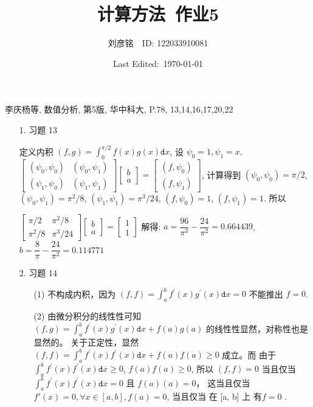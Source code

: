 \documentclass{article}
\title{计算方法\ 作业5}
\author{刘彦铭\ \ ID: 122033910081}
\date{Last Edited:\ \today}
\newcommand{\dd}{\mathtt{d}}
\begin{document}
\maketitle

李庆杨等, 数值分析, 第5版, 华中科大, P.78,
13,14,16,17,20,22

\begin{spacing}{1.5}

\begin{itemize}
    \item [1.] 习题 13
    
    定义内积 $(f, g) = \int_0^{\pi/2} f(x)g(x) \dd x$, 设 $\psi_0=1, \psi_1=x$. $\left[\begin{array}{cc}(\psi_0, \psi_0)&(\psi_0, \psi_1)\\(\psi_1, \psi_0)&(\psi_1,\psi_1)\end{array}\right]\left[\begin{array}{c}b\\a\end{array}\right] = \left[\begin{array}{c}(f, \psi_0)\\(f, \psi_1)\end{array}\right]$,
    计算得到 $(\psi_0, \psi_0) = \pi/2$, $(\psi_0, \psi_1)=\pi^2/8$, $(\psi_1, \psi_1)=\pi^3/24$, $(f, \psi_0) = 1$, $(f, \psi_1) = 1$. 所以 
    
    
    $\left[\begin{array}{cc}\pi/2&\pi^2/8\\\pi^2/8&\pi^3/24\end{array}\right]\left[\begin{array}{c}b\\a\end{array}\right] = \left[\begin{array}{c}1\\1\end{array}\right]$
    解得: $a=\dfrac{96}{\pi^3}-\dfrac{24}{\pi^2}=0.664439$, $b = \dfrac{8}{\pi} - \dfrac{24}{\pi^2} = 0.114771$
    \item [2.] 习题 14
    
    \begin{itemize}
        \item [(1)] 不构成内积，因为 $(f, f) = \int_a^b f^\prime(x)g^\prime(x) \dd x = 0$ 不能推出 $f=0$.
        \item [(2)] 由微分积分的线性性可知 $(f, g) = \int_a^b f^\prime(x)g^\prime(x) \dd x + f(a)g(a)$ 的线性性显然，对称性也是显然的。
        关于正定性，显然 $(f, f) = \int_a^b f^\prime(x) f^\prime(x)\dd x + f(a)f(a) \geq 0$ 成立。而 由于 $\int_a^b f^\prime(x) f^\prime(x) \dd x \geq 0$,
        $f(a)f(a)\geq 0$, 所以 $(f, f) = 0$ 当且仅当 $\int_a^b f^\prime(x) f^\prime(x) \dd x = 0$ 且 $f(a)(a) = 0$， 这当且仅当 $f'(x) = 0, \forall x\in[a,b], f(a)=0 $, 当且仅当 在 [a, b] 上 有$f = 0$ .


\end{itemize}
\end{itemize}
\end{spacing}
\end{document}
